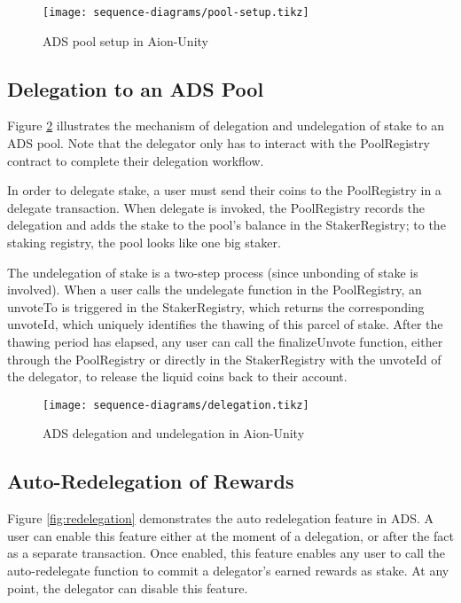 \begin{figure}[ht]
\centering
\texttt{[image: sequence-diagrams/pool-setup.tikz]}
\caption{ADS pool setup in Aion-Unity}
\label{fig:pool_setup}
\end{figure}
\clearpage

\subsection{Delegation to an ADS Pool}

Figure \ref{fig:delegation} illustrates the mechanism of delegation and undelegation of stake to an ADS pool. Note that the delegator only has to interact with the PoolRegistry contract to complete their delegation workflow. 

In order to delegate stake, a user must send their coins to the PoolRegistry in a delegate transaction. When delegate is invoked, the PoolRegistry records the delegation and adds the stake to the pool's balance in the StakerRegistry; to the staking registry, the pool looks like one big staker. 

The undelegation of stake is a two-step process (since unbonding of stake is involved). When a user calls the undelegate function in the PoolRegistry, an unvoteTo is triggered in the StakerRegistry, which returns the corresponding unvoteId, which uniquely identifies the thawing of this parcel of stake. After the thawing period has elapsed, any user can call the finalizeUnvote function, either through the PoolRegistry or directly in the StakerRegistry with the unvoteId of the delegator, to release the liquid coins back to their account. 

\begin{figure}[ht]
\centering
\texttt{[image: sequence-diagrams/delegation.tikz]}
\caption{ADS delegation and undelegation in Aion-Unity}
\label{fig:delegation}
\end{figure}
\clearpage

\subsection{Auto-Redelegation of Rewards}

Figure \ref{fig:redelegation} demonstrates the  auto redelegation feature in ADS. A user can enable this feature either at the moment of a delegation, or after the fact as a separate transaction. Once enabled, this feature enables any user to call the auto-redelegate function to commit a delegator's earned rewards as stake. At any point, the delegator can disable this feature. 

